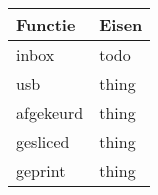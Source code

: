 \documentclass{article}
\begin{document}
\begin{table}[H]
    \centering
    \begin{tabular}%
    {>{\raggedright\arraybackslash}p{}%
    |>{\raggedright\arraybackslash}p{}}
    \rowcolor{myblue} Functie & Eisen\\\hline
    inbox & todo\\
    usb & thing \\
    afgekeurd & thing \\
    gesliced & thing \\
    geprint & thing \\
    \end{tabular}
    \caption*{}%
\end{table}
\end{document}
